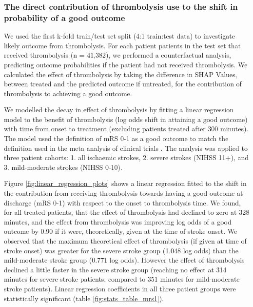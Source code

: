 

\subsubsection{The direct contribution of thrombolysis use to the shift in probability of a good outcome}

We used the first k-fold train/test set split (4:1 train:test data) to investigate likely outcome from thrombolysis. For each patient patients in the test set that received thrombolysis (n = 41,382), we performed a counterfactual analysis, predicting outcome probabilities if the patient had not received thrombolysis. We calculated the effect of thrombolysis by taking the difference in SHAP Values, between treated and the predicted outcome if untreated, for the contribution of thrombolysis to achieving a good outcome.

We modelled the decay in effect of thrombolysis by fitting a linear regression model to the benefit of thrombolysis (log odds shift in attaining a good outcome) with time from onset to treatment (excluding patients treated after 300 minutes). The model used the definition of mRS 0-1 as a good outcome to match the definition used in the meta analysis of clinical trials \cite{emberson_effect_2014}. The analysis was applied to three patient cohorts: 1. all ischaemic strokes, 2. severe strokes (NIHSS 11+), and 3. mild-moderate strokes (NIHSS 0-10). 

Figure \ref{fig:linear_regression_plots} shows a linear regression fitted to the shift in the contribution from receiving thrombolysis towards having a good outcome at discharge (mRS 0-1) with respect to the onset to thrombolysis time. We found, for all treated patients, that the effect of thrombolysis had declined to zero at 328 minutes, and the effect from thrombolysis was improving log odds of a good outcome by 0.90 if it were, theoretically, given at the time of stroke onset. We observed that the maximum theoretical effect of thrombolysis (if given at time of stroke onset) was greater for the severe stroke group (1.048 log odds) than the mild-moderate stroke group (0.771 log odds). However the effect of thrombolysis declined a little faster in the severe stroke group (reaching no effect at 314 minutes for severe stroke patients, compared to 351 minutes for mild-moderate stroke patients). Linear regression coefficients in all three patient groups were statistically significant (table \ref{fig:stats_table_mrs1}). 

